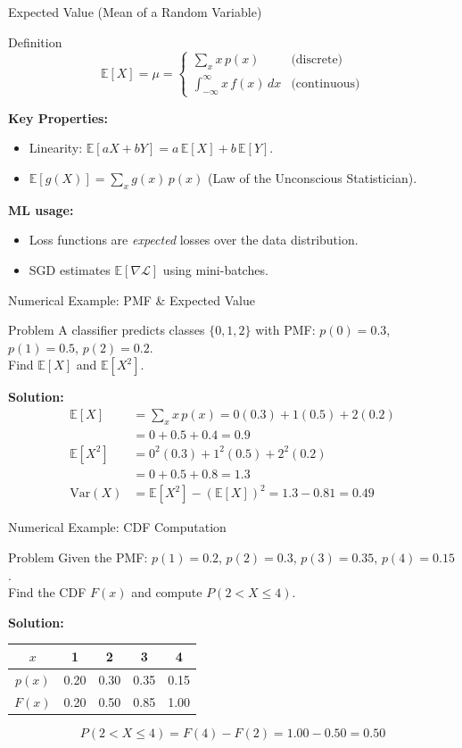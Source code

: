\begin{frame}{Expected Value (Mean of a Random Variable)}
\begin{block}{Definition}
\[
\mathbb{E}[X] = \mu = \begin{cases}
\displaystyle\sum_{x} x\, p(x) & \text{(discrete)}\\[8pt]
\displaystyle\int_{-\infty}^{\infty} x\, f(x)\, dx & \text{(continuous)}
\end{cases}
\]
\end{block}
\textbf{Key Properties:}
\begin{itemize}
    \item Linearity: $\mathbb{E}[aX + bY] = a\,\mathbb{E}[X] + b\,\mathbb{E}[Y]$.
    \item $\mathbb{E}[g(X)] = \sum_x g(x)\, p(x)$ \quad (Law of the Unconscious Statistician).
\end{itemize}
\textbf{ML usage:}
\begin{itemize}
    \item Loss functions are \emph{expected} losses over the data distribution.
    \item SGD estimates $\mathbb{E}[\nabla \mathcal{L}]$ using mini-batches.
\end{itemize}
\end{frame}

\begin{frame}{Numerical Example: PMF \& Expected Value}
\begin{exampleblock}{Problem}
A classifier predicts classes $\{0,1,2\}$ with PMF: $p(0)=0.3$, $p(1)=0.5$, $p(2)=0.2$.\\
Find $\mathbb{E}[X]$ and $\mathbb{E}[X^2]$.
\end{exampleblock}
\textbf{Solution:}
\begin{align*}
\mathbb{E}[X] &= \sum_x x\, p(x) = 0(0.3) + 1(0.5) + 2(0.2)\\
               &= 0 + 0.5 + 0.4 = \mathbf{0.9}\\[6pt]
\mathbb{E}[X^2] &= 0^2(0.3) + 1^2(0.5) + 2^2(0.2)\\
                 &= 0 + 0.5 + 0.8 = \mathbf{1.3}\\[6pt]
\mathrm{Var}(X) &= \mathbb{E}[X^2] - (\mathbb{E}[X])^2 = 1.3 - 0.81 = \mathbf{0.49}
\end{align*}
\end{frame}

\begin{frame}{Numerical Example: CDF Computation}
\begin{exampleblock}{Problem}
Given the PMF: $p(1)=0.2$, $p(2)=0.3$, $p(3)=0.35$, $p(4)=0.15$.\\
Find the CDF $F(x)$ and compute $P(2 < X \leq 4)$.
\end{exampleblock}
\textbf{Solution:}
\begin{table}[h]
\centering
\begin{tabular}{c|cccc}
$x$ & 1 & 2 & 3 & 4\\ \hline
$p(x)$ & 0.20 & 0.30 & 0.35 & 0.15\\
$F(x)$ & 0.20 & 0.50 & 0.85 & 1.00
\end{tabular}
\end{table}
\[
P(2 < X \leq 4) = F(4) - F(2) = 1.00 - 0.50 = \mathbf{0.50}
\]
\end{frame}
